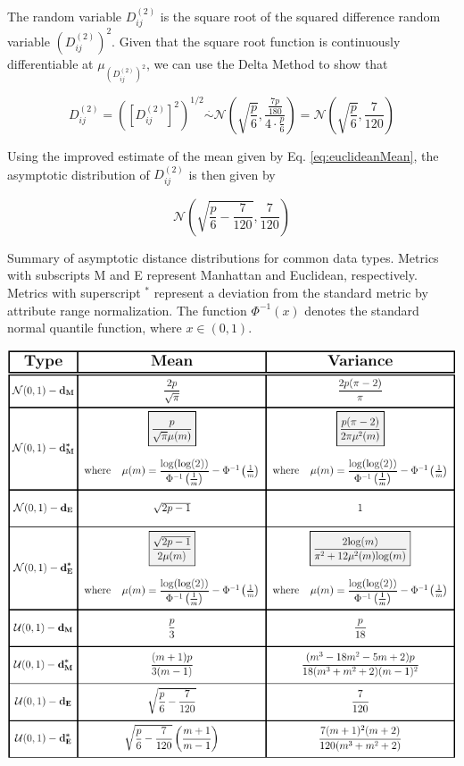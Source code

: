 \documentclass[10pt,letterpaper]{article}\usepackage[]{graphicx}\usepackage[]{color}
\begin{document}
The random variable $D^{(2)}_{ij}$ is the square root of the squared difference random variable $\left(D^{(2)}_{ij}\right)^2$. Given that the square root function is continuously differentiable at $\mu_{\left(D^{(2)}_{ij}\right)^2}$, we can use the Delta Method \cite{allStats} to show that

\begin{equation}\label{eq:uniformEucDistr}
D^{(2)}_{ij} = \left(\left[D^{(2)}_{ij}\right]^2\right)^{1/2} \overset{.}{\sim} \mathcal{N}\left(\sqrt{\frac{p}{6}},\frac{\frac{7p}{180}}{4 \cdot \frac{p}{6}}\right) = \mathcal{N}\left(\sqrt{\frac{p}{6}},\frac{7}{120}\right)
\end{equation}

Using the improved estimate of the mean given by Eq. \ref{eq:euclideanMean}, the asymptotic distribution of $D^{(2)}_{ij}$ is then given by

\begin{equation}\label{eq:uniformEucDistr2}
\mathcal{N}\left(\sqrt{\frac{p}{6} - \frac{7}{120}},\frac{7}{120}\right)
\end{equation}

\begin{table}[H]
\caption{Summary of asymptotic distance distributions for common data types. Metrics with subscripts M and E represent Manhattan and Euclidean, respectively. Metrics with superscript $^*$ represent a deviation from the standard metric by attribute range normalization. The function $\Phi^{-1}(x)$ denotes the standard normal quantile function, where $x \in (0,1)$.}
\label{tab:dist_distr_common}
\centering
\includegraphics[width=\textwidth]{typical_data-metric_tab.pdf}
\end{table}
\end{document}
